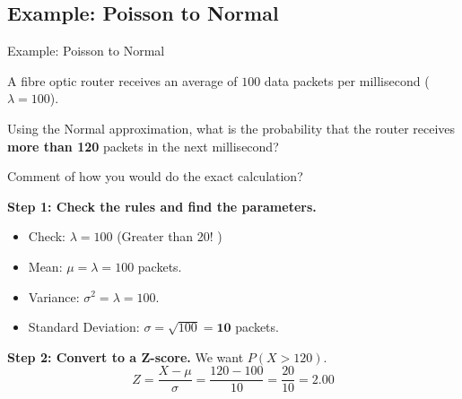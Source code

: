 \subsection{Example: Poisson to Normal}
\begin{frame}[allowframebreaks]{Example: Poisson to Normal}
    \begin{example}
        A fibre optic router receives an average of $100$ data packets per millisecond ($\lambda = 100$). 
        
        Using the Normal approximation, what is the probability that the router receives \textbf{more than 120} packets in the next millisecond?
        
        Comment of how you would do the exact calculation?
    \end{example}


    \begin{solution}
        \textbf{Step 1: Check the rules and find the parameters.}
        \begin{itemize}
            \item Check: $\lambda = 100$ (Greater than 20! \checkmark)
            \item Mean: $\mu = \lambda = 100$ packets.
            \item Variance: $\sigma^2 = \lambda = 100$.
            \item Standard Deviation: $\sigma = \sqrt{100} = \mathbf{10}$ packets.
        \end{itemize}
        
        \vspace{0.2cm}
        \textbf{Step 2: Convert to a Z-score.}
        We want $P(X > 120)$.
        \[ Z = \frac{X - \mu}{\sigma} = \frac{120 - 100}{10} = \frac{20}{10} = \mathbf{2.00} \]
        
    \end{solution}
\end{frame}

